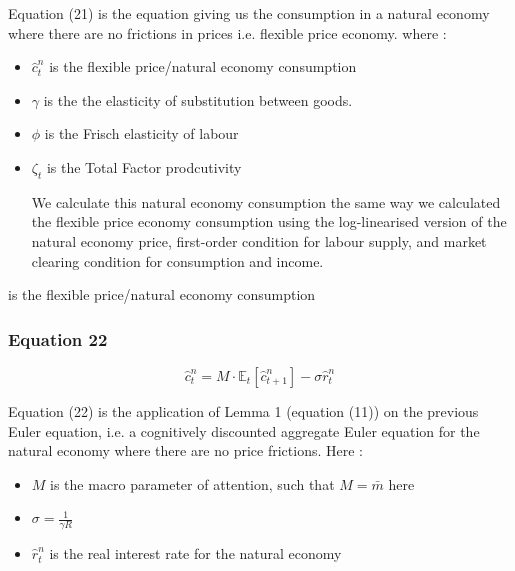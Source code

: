 \documentclass{article}
\begin{document}
Equation (21) is the equation giving us the consumption in a natural economy where there are no frictions in prices i.e. flexible price economy. where :
\begin{itemize}
    \item $\hat{c}_{t}^{n}$ is the flexible price/natural economy consumption 
    \item $\gamma$ is the the elasticity of substitution between goods. 
    \item $\phi$ is the Frisch elasticity of labour
    \item $\zeta_{t}$ is the Total Factor prodcutivity

We calculate this natural economy consumption the same way we calculated the flexible price economy consumption using the log-linearised version of the natural economy price, first-order condition for labour supply, and market clearing condition for consumption and income. 
\end{itemize} is the flexible price/natural economy consumption

\subsubsection*{Equation 22}
\begin{equation}
    \hat{c}^{n}_{t} = M\cdot\mathbb{E}_{t}\left[\hat{c}^{n}_{t+1}\right]-\sigma\hat{r}^{n}_{t}
\end{equation}

Equation (22) is the application of Lemma 1 (equation (11)) on the previous Euler equation, i.e. a cognitively discounted aggregate Euler equation for the natural economy where there are no price frictions. Here : 
\begin{itemize}
    \item $M$ is the macro parameter of attention, such that $M=\bar{m}$ here
    \item $\sigma=\frac{1}{\gamma R}$ 
    \item $\hat r_{t}^{n}$ is the real interest rate for the natural economy
\end{itemize}
\end{document}
